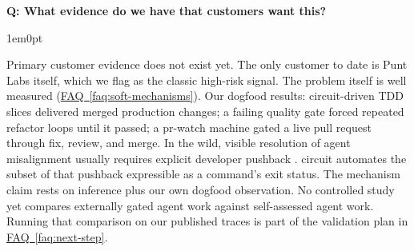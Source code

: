 \documentclass[11pt,letterpaper]{article}
\newcounter{faqnum}
\newenvironment{faqpair}[1]{%
  \needspace{4\baselineskip}%
  \vspace{0.5em}%
  \refstepcounter{faqnum}%
  \noindent\textbf{\color{SectionBlue}Q\thefaqnum: #1}\par\nopagebreak[4]%
  \vspace{0.2em}%
  \begin{adjustwidth}{1em}{0pt}%
  \setlength{\parindent}{0pt}%
}{%
  \end{adjustwidth}%
  \vspace{0.5em}%
}
\newcommand{\faqref}[1]{\hyperref[#1]{FAQ~\ref*{#1}}}
\begin{document}
\begin{faqpair}{What evidence do we have that customers want this?}
\label{faq:customer-evidence}
  Primary customer evidence does not exist yet. The only customer to date is Punt Labs itself, which we flag as the classic high-risk signal. The problem itself is well measured (\faqref{faq:soft-mechanisms}). Our dogfood results: circuit-driven TDD slices delivered merged production changes; a failing quality gate forced repeated refactor loops until it passed; a pr-watch machine gated a live pull request through fix, review, and merge. In the wild, visible resolution of agent misalignment usually requires explicit developer pushback \cite{tang2026codingagentmisalignment}. circuit automates the subset of that pushback expressible as a command's exit status. The mechanism claim rests on inference plus our own dogfood observation. No controlled study yet compares externally gated agent work against self-assessed agent work. Running that comparison on our published traces is part of the validation plan in \faqref{faq:next-step}.
\end{faqpair}
\end{document}
